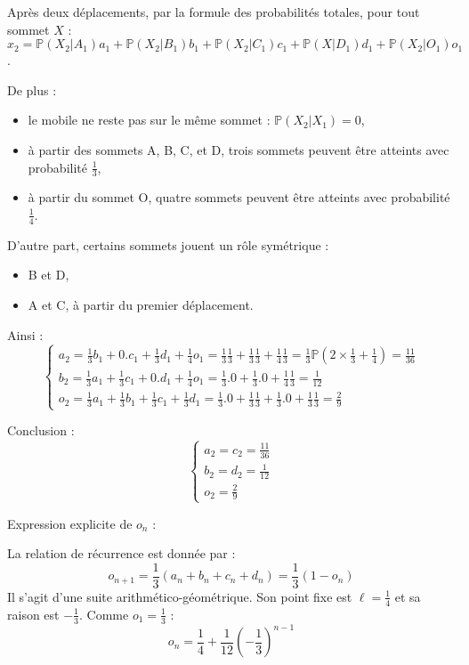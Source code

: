 \documentclass[10pt,a4paper]{article}
\begin{document}
Après deux déplacements, par la formule des probabilités totales, pour tout sommet $X$ :\\
$x_2 = \mathbb{P}(X_2|A_1)a_1 + \mathbb{P}(X_2|B_1)b_1 + \mathbb{P}(X_2|C_1)c_1 +
\mathbb{P}(X|D_1)d_1 + \mathbb{P}(X_2|O_1)o_1$.

De plus :
\begin{itemize}
 \item le mobile ne reste pas sur le même sommet : $\mathbb{P}(X_2|X_1) = 0$,
 \item à partir des sommets A, B, C, et D, trois sommets peuvent être atteints avec probabilité $\frac{1}{3}$,
 \item à partir du sommet O, quatre sommets peuvent être atteints avec probabilité $\frac{1}{4}$.
 \end{itemize}
 D'autre part, certains sommets jouent un rôle symétrique :
 \begin{itemize}
 \item B et D,
 \item A et C, à partir du premier déplacement.
\end{itemize}
Ainsi :
\[
\begin{cases}
  a_2 = \frac{1}{3}b_1 + 0.c_1 + \frac{1}{3}d_1 + \frac{1}{4}o_1 = \frac{1}{3}\frac{1}{3} + \frac{1}{3}\frac{1}{3} + \frac{1}{4}\frac{1}{3} = \frac{1}{3}\mathbb{P}(2 \times \frac{1}{3} + \frac{1}{4}) = \frac{11}{36}\\
  b_2 = \frac{1}{3}a_1 + \frac{1}{3} c_1 + 0.d_1 + \frac{1}{4}o_1 = \frac{1}{3}.0 + \frac{1}{3}.0 + \frac{1}{4}\frac{1}{3} = \frac{1}{12}\\
  o_2 = \frac{1}{3}a_1 + \frac{1}{3}b_1 + \frac{1}{3}c_1 + \frac{1}{3}d_1 = \frac{1}{3}.0 + \frac{1}{3}\frac{1}{3} + \frac{1}{3}.0 + \frac{1}{3}\frac{1}{3} = \frac{2}{9}
 \end{cases}
\]

Conclusion :
\[
\begin{cases}
  a_2 = c_2 = \frac{11}{36}\\
  b_2 = d_2 = \frac{1}{12}\\
  o_2 = \frac{2}{9}
 \end{cases}
\]

\q Expression explicite de \( o_n \) :

La relation de récurrence est donnée par :
\[
o_{n+1} = \frac{1}{3}(a_n + b_n + c_n + d_n) = \frac{1}{3} (1 - o_n)
\]
Il s'agit d'une suite arithmético-géométrique. Son point fixe est \( \ell = \frac{1}{4} \) et sa
raison est \( -\frac{1}{3} \). Comme \( o_1 = \frac{1}{3} \) :
\[
o_n = \frac{1}{4} + \frac{1}{12} \left( -\frac{1}{3} \right)^{n-1}
\]
\end{document}
